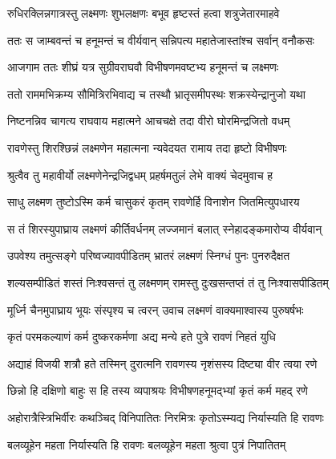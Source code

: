 
\twolineshloka
{रुधिरक्लिन्नगात्रस्तु लक्ष्मणः शुभलक्षणः}
{बभूव हृष्टस्तं हत्वा शत्रुजेतारमाहवे} %

\twolineshloka
{ततः स जाम्बवन्तं च हनूमन्तं च वीर्यवान्}
{सन्निपत्य महातेजास्तांश्च सर्वान् वनौकसः} %

\twolineshloka
{आजगाम ततः शीघ्रं यत्र सुग्रीवराघवौ}
{विभीषणमवष्टभ्य हनूमन्तं च लक्ष्मणः} %

\twolineshloka
{ततो राममभिक्रम्य सौमित्रिरभिवाद्य च}
{तस्थौ भ्रातृसमीपस्थः शक्रस्येन्द्रानुजो यथा} %

\twolineshloka
{निष्टनन्निव चागत्य राघवाय महात्मने}
{आचचक्षे तदा वीरो घोरमिन्द्रजितो वधम्} %

\twolineshloka
{रावणेस्तु शिरश्छिन्नं लक्ष्मणेन महात्मना}
{न्यवेदयत रामाय तदा हृष्टो विभीषणः} %

\twolineshloka
{श्रुत्वैव तु महावीर्यो लक्ष्मणेनेन्द्रजिद्वधम्}
{प्रहर्षमतुलं लेभे वाक्यं चेदमुवाच ह} %

\twolineshloka
{साधु लक्ष्मण तुष्टोऽस्मि कर्म चासुकरं कृतम्}
{रावणेर्हि विनाशेन जितमित्युपधारय} %

\twolineshloka
{स तं शिरस्युपाघ्राय लक्ष्मणं कीर्तिवर्धनम्}
{लज्जमानं बलात् स्नेहादङ्कमारोप्य वीर्यवान्} %

\twolineshloka
{उपवेश्य तमुत्सङ्गे परिष्वज्यावपीडितम्}
{भ्रातरं लक्ष्मणं स्निग्धं पुनः पुनरुदैक्षत} %

\twolineshloka
{शल्यसम्पीडितं शस्तं निःश्वसन्तं तु लक्ष्मणम्}
{रामस्तु दुःखसन्तप्तं तं तु निःश्वासपीडितम्} %

\twolineshloka
{मूर्ध्नि चैनमुपाघ्राय भूयः संस्पृश्य च त्वरन्}
{उवाच लक्ष्मणं वाक्यमाश्वास्य पुरुषर्षभः} %

\twolineshloka
{कृतं परमकल्याणं कर्म दुष्करकर्मणा}
{अद्य मन्ये हते पुत्रे रावणं निहतं युधि} %

\twolineshloka
{अद्याहं विजयी शत्रौ हते तस्मिन् दुरात्मनि}
{रावणस्य नृशंसस्य दिष्ट्या वीर त्वया रणे} %

\twolineshloka
{छिन्नो हि दक्षिणो बाहुः स हि तस्य व्यपाश्रयः}
{विभीषणहनूमद्भ्यां कृतं कर्म महद् रणे} %

\twolineshloka
{अहोरात्रैस्त्रिभिर्वीरः कथञ्चिद् विनिपातितः}
{निरमित्रः कृतोऽस्म्यद्य निर्यास्यति हि रावणः} %

\twolineshloka
{बलव्यूहेन महता निर्यास्यति हि रावणः}
{बलव्यूहेन महता श्रुत्वा पुत्रं निपातितम्} %

